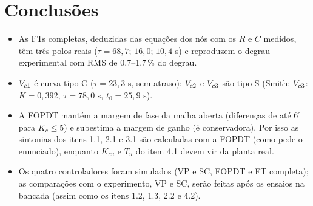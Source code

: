 \section{Conclusões}
\begin{itemize}
\item As FTs completas, deduzidas das equações dos nós com os $R$ e $C$ medidos, têm três polos reais ($\tau=68{,}7$; $16{,}0$; $10{,}4$ s) e reproduzem o degrau experimental com RMS de 0,7--1,7\,\% do degrau.
\item $V_{c1}$ é curva tipo C ($\tau=23{,}3$ s, sem atraso); $V_{c2}$ e $V_{c3}$ são tipo S (Smith: $V_{c3}$: $K=0{,}392$, $\tau=78{,}0$ s, $t_0=25{,}9$ s).
\item A FOPDT mantém a margem de fase da malha aberta (diferenças de até $6^\circ$ para $K_c\le5$) e subestima a margem de ganho (é conservadora). Por isso as sintonias dos itens 1.1, 2.1 e 3.1 são calculadas com a FOPDT (como pede o enunciado), enquanto $K_{cu}$ e $T_u$ do item 4.1 devem vir da planta real.
\item Os quatro controladores foram simulados (VP e SC, FOPDT e FT completa); as comparações com o experimento, VP e SC, serão feitas após os ensaios na bancada (assim como os itens 1.2, 1.3, 2.2 e 4.2).
\end{itemize}
